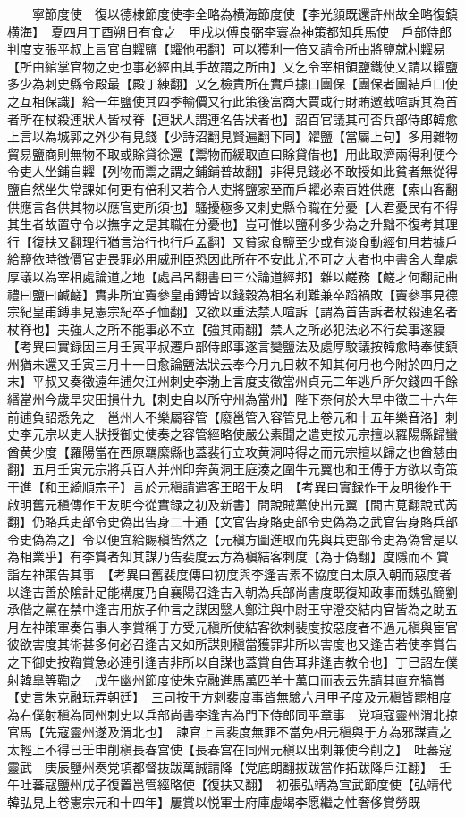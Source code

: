 　　寧節度使　復以德棣節度使李全略為横海節度使【李光顔既還許州故全略復鎮横海】　夏四月丁酉朔日有食之　甲戌以傅良弼李寰為神策都知兵馬使　戶部侍郎判度支張平叔上言官自糶鹽【糶他弔翻】可以獲利一倍又請令所由將鹽就村糶易【所由綰掌官物之吏也事必經由其手故謂之所由】又乞令宰相領鹽鐵使又請以糶鹽多少為刺史縣令殿最【殿丁練翻】又乞檢責所在實戶據口團保【團保者團結戶口使之互相保識】給一年鹽使其四季輸價又行此策後富商大賈或行財賄邀截喧訴其為首者所在杖殺連狀人皆杖脊【連狀人謂連名告狀者也】詔百官議其可否兵部侍郎韓愈上言以為城郭之外少有見錢【少詩沼翻見賢遍翻下同】糴鹽【當屬上句】多用雜物貿易鹽商則無物不取或賖貸徐還【鬻物而緩取直曰賖貸借也】用此取濟兩得利便今令吏人坐鋪自糶【列物而鬻之謂之鋪鋪普故翻】非得見錢必不敢授如此貧者無從得鹽自然坐失常課如何更有倍利又若令人吏將鹽家至而戶糶必索百姓供應【索山客翻供應言各供其物以應官吏所須也】騷擾極多又刺史縣令職在分憂【人君憂民有不得其生者故置守令以撫字之是其職在分憂也】豈可惟以鹽利多少為之升黜不復考其理行【復扶又翻理行猶言治行也行戶孟翻】又貧家食鹽至少或有淡食動經旬月若據戶給鹽依時徵價官吏畏罪必用威刑臣恐因此所在不安此尤不可之大者也中書舍人韋處厚議以為宰相處論道之地【處昌呂翻書曰三公論道經邦】雜以鹺務【鹺才何翻記曲禮曰鹽曰鹹鹺】實非所宜竇參皇甫鎛皆以錢穀為相名利難兼卒蹈禍敗【竇參事見德宗紀皇甫鎛事見憲宗紀卒子恤翻】又欲以重法禁人喧訴【謂為首告訴者杖殺連名者杖脊也】夫強人之所不能事必不立【強其兩翻】禁人之所必犯法必不行矣事遂寢　【考異曰實録因三月壬寅平叔遷戶部侍郎事遂言變鹽法及處厚駮議按韓愈時奉使鎮州猶未還又壬寅三月十一日愈論鹽法狀云奉今月九日敕不知其何月也今附於四月之末】平叔又奏徵遠年逋欠江州刺史李渤上言度支徵當州貞元二年逃戶所欠錢四千餘緡當州今歲旱灾田損什九【刺史自以所守州為當州】陛下奈何於大旱中徵三十六年前逋負詔悉免之　邕州人不樂屬容管【廢邕管入容管見上卷元和十五年樂音洛】刺史李元宗以吏人狀授御史使奏之容管經略使嚴公素聞之遣吏按元宗擅以羅陽縣歸蠻酋黄少度【羅陽當在西原羈縻縣也蓋裴行立攻黄洞時得之而元宗擅以歸之也酋慈由翻】五月壬寅元宗將兵百人并州印奔黄洞王庭湊之圍牛元翼也和王傅于方欲以奇策干進【和王綺順宗子】言於元稹請遣客王昭于友明　【考異曰實録作于友明後作于啟明舊元稹傳作王友明今從實録之初及新書】間說賊黨使出元翼【間古莧翻說式芮翻】仍賂兵吏部令史偽出告身二十通【文官告身賂吏部令史偽為之武官告身賂兵部令史偽為之】令以便宜給賜稹皆然之【元稹方圖進取而先與兵吏部令史為偽曾是以為相業乎】有李賞者知其謀乃告裴度云方為稹結客刺度【為于偽翻】度隱而不賞詣左神策告其事　【考異曰舊裴度傳曰初度與李逢吉素不協度自太原入朝而惡度者以逢吉善於隂計足能構度乃自襄陽召逢吉入朝為兵部尚書度既復知政事而魏弘簡劉承偕之黨在禁中逢吉用族子仲言之謀因毉人鄭注與中尉王守澄交結内官皆為之助五月左神策軍奏告事人李賞稱于方受元稹所使結客欲刺裴度按惡度者不過元稹與宦官彼欲害度其術甚多何必召逢吉又如所謀則稹當獲罪非所以害度也又逢吉若使李賞告之下御史按鞫賞急必連引逢吉非所以自謀也蓋賞自告耳非逢吉教令也】丁巳詔左僕射韓臯等鞫之　戊午幽州節度使朱克融進馬萬匹羊十萬口而表云先請其直充犒賞【史言朱克融玩弄朝廷】　三司按于方刺裴度事皆無驗六月甲子度及元稹皆罷相度為右僕射稹為同州刺史以兵部尚書李逢吉為門下侍郎同平章事　党項寇靈州渭北掠官馬【先寇靈州遂及渭北也】　諫官上言裴度無罪不當免相元稹與于方為邪謀責之太輕上不得已壬申削稹長春宫使【長春宫在同州元稹以出刺兼使今削之】　吐蕃寇靈武　庚辰鹽州奏党項都督抜跋萬誠請降【党底朗翻拔跋當作拓跋降戶江翻】　壬午吐蕃寇鹽州戊子復置邕管經略使【復扶又翻】　初張弘靖為宣武節度使【弘靖代韓弘見上卷憲宗元和十四年】屢賞以悦軍士府庫虚竭李愿繼之性奢侈賞勞既